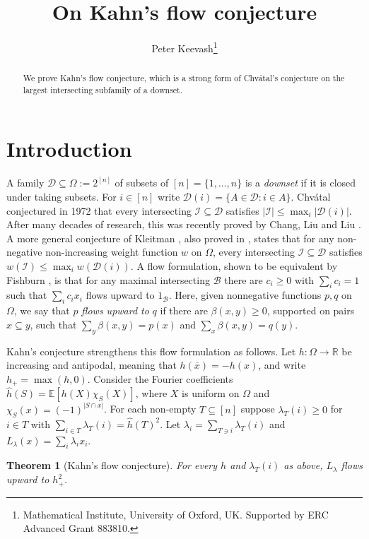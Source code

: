 \documentclass{article}
\title{On Kahn's flow conjecture}
\author{Peter Keevash\thanks{Mathematical Institute, University of Oxford, UK. Supported by ERC Advanced Grant 883810.}}
\date{}
\theoremstyle{plain}
\newtheorem{theo}{Theorem}[section]
\theoremstyle{definition}
\newcommand{\mc}[1]{\mathcal{#1}}
\newcommand{\mb}[1]{\mathbb{#1}}
\newcommand{\sub}{\subseteq}
\newcommand{\ov}{\overline}
\newcommand{\OO}{\Omega}
\begin{document}
\maketitle

\begin{abstract}
We prove Kahn's flow conjecture, which is a strong form of Chv\'atal's conjecture 
on the largest intersecting subfamily of a downset.
\end{abstract}

\section{Introduction}

A family $\mc D\sub \OO:=2^{[n]}$ of subsets of $[n]=\{1,\dots,n\}$ 
is a \emph{downset} if it is closed under taking subsets.  For $i\in[n]$ write $\mc D(i)=\{A\in\mc D:i\in A\}$.  
Chv\'atal conjectured \cite{Chvatal} in 1972 that every intersecting $\mc I\sub\mc D$ satisfies $|\mc I|\le\max_i|\mc D(i)|$.  
After many decades of research, this was recently proved by Chang, Liu and Liu \cite{CLL}.
A more general conjecture of Kleitman \cite{Kleitman}, also proved in \cite{CLL},
states that for any non-negative non-increasing weight function $w$ on $\OO$,
every intersecting $\mc I\sub\mc D$ satisfies $w(\mc I) \le\max_i w(\mc D(i))$.
A flow formulation, shown to be equivalent by Fishburn \cite{F},
is that for any maximal intersecting $\mc B$ there are $c_i\ge0$ with $\sum_i c_i=1$ 
such that $\sum_i c_i x_i$ flows upward to $1_{\mc B}$.
Here, given nonnegative functions $p,q$ on $\OO$, we say that $p$ \emph{flows upward to} $q$
if there are $\beta(x,y)\ge0$, supported on pairs $x\sub y$, 
such that $\sum_y \beta(x,y)=p(x)$ and  $\sum_x \beta(x,y)=q(y)$.
 
Kahn's conjecture \cite[Conjecture~3.6]{FKKK} strengthens this flow formulation as follows.
Let $h:\OO\to\mb R$ be increasing and antipodal, meaning that $h(\ov x)=-h(x)$, and write $h_+=\max(h,0)$.
Consider the Fourier coefficients $\widehat h(S)=\mb E[h(X)\chi_S(X)]$, where $X$ is uniform on $\OO$ and $\chi_S(x)=(-1)^{|S\cap x|}$.
For each non-empty $T \sub [n]$ suppose $\lambda_T(i)\ge0$ for $i\in T$ with $\sum_{i\in T}\lambda_T(i)=\widehat h(T)^2$.
Let $\lambda_i=\sum_{T\ni i}\lambda_T(i)$ and $L_\lambda(x)=\sum_i\lambda_i x_i$.

\begin{theo}[Kahn's flow conjecture]\label{thm:kahn}
For every $h$ and $\lambda_T(i)$ as above, $L_\lambda$ flows upward to $h_+^2$.
\end{theo}
\end{document}

